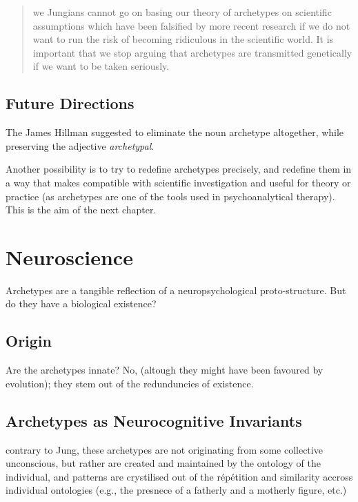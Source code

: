 \documentclass[
]{book}
\begin{document}
\begin{quote}
we Jungians cannot go on basing our theory of archetypes on scientific assumptions which have been falsified by more recent research if we do not want to run the risk of becoming ridiculous in the scientific world. It is important that we stop arguing that archetypes are transmitted genetically if we want to be taken seriously. \citep{roesler2012archetypes}
\end{quote}

\hypertarget{future-directions}{%
\subsection{Future Directions}\label{future-directions}}

The James Hillman suggested to eliminate the noun archetype altogether, while preserving the adjective \emph{archetypal}.

Another possibility is to try to redefine archetypes precisely, and redefine them in a way that makes compatible with scientific investigation and useful for theory or practice (as archetypes are one of the tools used in psychoanalytical therapy). This is the aim of the next chapter.

\hypertarget{neuroscience}{%
\section{Neuroscience}\label{neuroscience}}

Archetypes are a tangible reflection of a neuropsychological proto-structure. But do they have a biological existence?

\hypertarget{origin}{%
\subsection{Origin}\label{origin}}

Are the archetypes innate? No, (altough they might have been favoured by evolution); they stem out of the redunduncies of existence.

\hypertarget{archetypes-as-neurocognitive-invariants}{%
\subsection{Archetypes as Neurocognitive Invariants}\label{archetypes-as-neurocognitive-invariants}}

contrary to Jung, these archetypes are not originating from some collective unconscious, but rather are created and maintained by the ontology of the individual, and patterns are crystilised out of the répétition and similarity accross individual ontologies (e.g., the presnece of a fatherly and a motherly figure, etc.)
\end{document}
